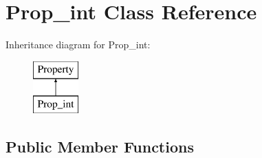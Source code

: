 \hypertarget{classProp__int}{\section{Prop\-\_\-int Class Reference}
\label{classProp__int}
}
Inheritance diagram for Prop\-\_\-int\-:\begin{figure}[H]
\begin{center}
\leavevmode
\includegraphics[height=2.000000cm]{classProp__int}
\end{center}
\end{figure}
\subsection*{Public Member Functions}
